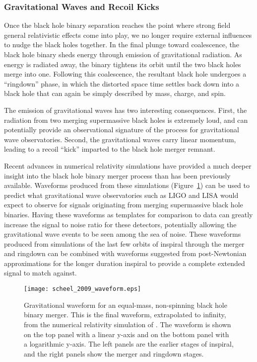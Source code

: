\subsubsection{Gravitational Waves and Recoil Kicks}

Once the black hole binary separation reaches the point where strong field general relativistic effects come into play, we no longer require external influences to nudge the black holes together.  In the final plunge toward coalescence, the black hole binary sheds energy through emission of gravitational radiation.  As energy is radiated away, the binary tightens its orbit until the two black holes merge into one.  Following this coalescence, the resultant black hole undergoes a ``ringdown'' phase, in which the distorted space time settles back down into a black hole that can again be simply described by mass, charge, and spin.

The emission of gravitational waves has two interesting consequences.  First, the radiation from two merging supermassive black holes is extremely loud, and can potentially provide an observational signature of the process for gravitational wave observatories.  Second, the gravitational waves carry linear momentum, leading to a recoil ``kick'' imparted to the black hole merger remnant.

Recent advances in numerical relativity simulations have provided a much deeper insight into the black hole binary merger process than has been previously available.  Waveforms produced from these simulations (Figure~\ref{fig:waveform}) can be used to predict what gravitational wave observatories such as LIGO and LISA would expect to observe for signals originating from merging supermassive black hole binaries.  Having these waveforms as templates for comparison to data can greatly increase the signal to noise ratio for these detectors, potentially allowing the gravitational wave events to be seen among the sea of noise.  These waveforms produced from simulations of the last few orbits of inspiral through the merger and ringdown can be combined with waveforms suggested from post-Newtonian approximations for the longer duration inspiral to provide a complete extended signal to match against.

\begin{figure}[t]
\centering
\texttt{[image: scheel\_2009\_waveform.eps]}
\caption[Gravitational waveform for a black hole binary merger]{\footnotesize Gravitational waveform for an equal-mass, non-spinning black hole binary merger. This is the final waveform, extrapolated to infinity, from the numerical relativity simulation of \citet{scheel_2009}.  The waveform is shown on the top panel with a linear y-axis and on the bottom panel with a logarithmic y-axis.  The left panels are the earlier stages of inspiral, and the right panels show the merger and ringdown stages.}
\label{fig:waveform}
\end{figure}

